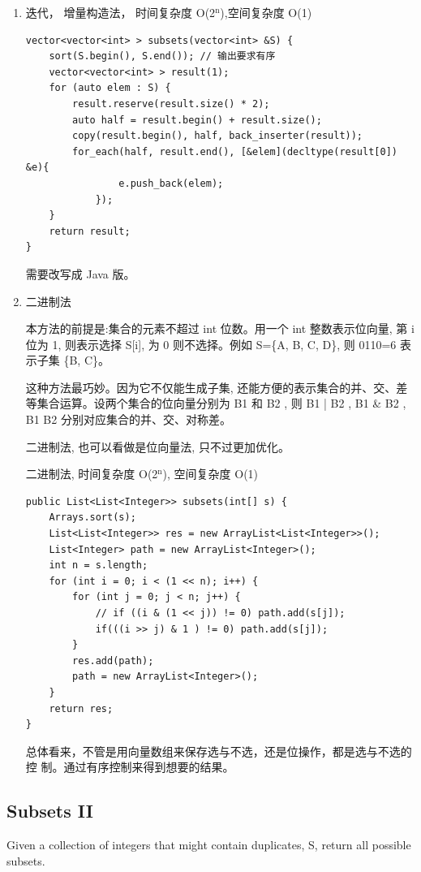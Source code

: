 \documentclass[12pt]{book}
\begin{document}
\begin{enumerate}
\item 迭代， 增量构造法， 时间复杂度 O(2$^{\text{n}}$),空间复杂度 O(1)
\label{sec-9-1-1-3}

\lstset{language=java,label= ,caption= ,numbers=none}
\begin{lstlisting}
vector<vector<int> > subsets(vector<int> &S) {
    sort(S.begin(), S.end()); // 输出要求有序
    vector<vector<int> > result(1);
    for (auto elem : S) {
        result.reserve(result.size() * 2);
        auto half = result.begin() + result.size();
        copy(result.begin(), half, back_inserter(result));
        for_each(half, result.end(), [&elem](decltype(result[0]) &e){
                e.push_back(elem);
            });
    }
    return result;
}
\end{lstlisting}

需要改写成 Java 版。

\item 二进制法
\label{sec-9-1-1-4}

本方法的前提是:集合的元素不超过 int 位数。用一个 int 整数表示位向量, 第 i 位为 1, 则表示选择 S[i], 为 0 则不选择。例如 S=\{A, B, C, D\}, 则 0110=6 表示子集 \{B, C\}。

这种方法最巧妙。因为它不仅能生成子集, 还能方便的表示集合的并、交、差等集合运算。设两个集合的位向量分别为 B1 和 B2 , 则 B1 | B2 ,  B1 \& B2 ,  B1 B2 分别对应集合的并、交、对称差。

二进制法, 也可以看做是位向量法, 只不过更加优化。

二进制法, 时间复杂度 O(2$^{\text{n}}$), 空间复杂度 O(1)

\lstset{language=java,label= ,caption= ,numbers=none}
\begin{lstlisting}
public List<List<Integer>> subsets(int[] s) {
    Arrays.sort(s);   
    List<List<Integer>> res = new ArrayList<List<Integer>>();
    List<Integer> path = new ArrayList<Integer>();
    int n = s.length;
    for (int i = 0; i < (1 << n); i++) {
        for (int j = 0; j < n; j++) {
            // if ((i & (1 << j)) != 0) path.add(s[j]);
            if(((i >> j) & 1 ) != 0) path.add(s[j]);   
        }
        res.add(path);
        path = new ArrayList<Integer>();
    }
    return res;
}
\end{lstlisting}

总体看来，不管是用向量数组来保存选与不选，还是位操作，都是选与不选的控
制。通过有序控制来得到想要的结果。
\end{enumerate}

\subsection{Subsets II}
\label{sec-9-1-2}
Given a collection of integers that might contain duplicates, S, return all possible subsets.
\end{document}

